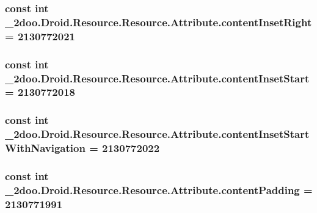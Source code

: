 \hypertarget{class__2doo_1_1_droid_1_1_resource_1_1_attribute_7f37ba70c1d389d89ade357d38e64f2b}{
\subsubsection[{contentInsetRight}]{\setlength{\rightskip}{0pt plus 5cm}const int \_\-2doo.Droid.Resource.Resource.Attribute.contentInsetRight = 2130772021}}
\label{class__2doo_1_1_droid_1_1_resource_1_1_attribute_7f37ba70c1d389d89ade357d38e64f2b}


\hypertarget{class__2doo_1_1_droid_1_1_resource_1_1_attribute_f88916603a82486ed787ac1e1e5f0b56}{
\subsubsection[{contentInsetStart}]{\setlength{\rightskip}{0pt plus 5cm}const int \_\-2doo.Droid.Resource.Resource.Attribute.contentInsetStart = 2130772018}}
\label{class__2doo_1_1_droid_1_1_resource_1_1_attribute_f88916603a82486ed787ac1e1e5f0b56}


\hypertarget{class__2doo_1_1_droid_1_1_resource_1_1_attribute_abb83291e3b74293e0d9d15a5ee5493d}{
\subsubsection[{contentInsetStartWithNavigation}]{\setlength{\rightskip}{0pt plus 5cm}const int \_\-2doo.Droid.Resource.Resource.Attribute.contentInsetStartWithNavigation = 2130772022}}
\label{class__2doo_1_1_droid_1_1_resource_1_1_attribute_abb83291e3b74293e0d9d15a5ee5493d}


\hypertarget{class__2doo_1_1_droid_1_1_resource_1_1_attribute_127e9230bbf8023fa7d01a3c0937bfb6}{
\subsubsection[{contentPadding}]{\setlength{\rightskip}{0pt plus 5cm}const int \_\-2doo.Droid.Resource.Resource.Attribute.contentPadding = 2130771991}}
\label{class__2doo_1_1_droid_1_1_resource_1_1_attribute_127e9230bbf8023fa7d01a3c0937bfb6}


